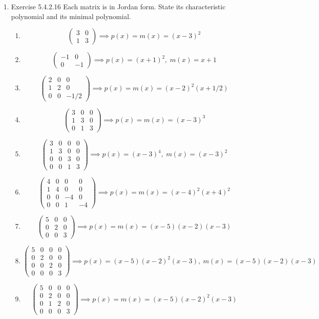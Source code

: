 \documentclass[a4paper]{article}
\begin{document}
\begin{enumerate}
\item{Exercise 5.4.2.16} Each matrix is in Jordan form. State its characteristic polynomial and its minimal polynomial.

\begin{enumerate}
	\item
	$$
	\begin{pmatrix}
	3 & 0 \\ 1 & 3
	\end{pmatrix}
	\implies p(x) = m(x) = (x-3)^2
	$$
	\item
	$$
	\begin{pmatrix}
	-1 & 0 \\ 0 & -1
	\end{pmatrix}
	\implies p(x) = (x+1)^2, \; m(x) = x+1
	$$
	\item
	$$
	\begin{pmatrix}
	2 & 0 & 0 \\ 1 & 2 & 0 \\ 0 & 0 & -1/2
	\end{pmatrix}
	\implies p(x) = m(x) = (x-2)^2(x+1/2)
	$$
	\item
	$$
	\begin{pmatrix}
	3 & 0 & 0 \\ 1 & 3 & 0 \\ 0 & 1 & 3
	\end{pmatrix}
	\implies p(x) = m(x) = (x-3)^3
	$$
	\item
	$$
	\begin{pmatrix}
	3&0&0&0 \\ 1&3&0&0 \\ 0&0&3&0 \\ 0&0&1&3
	\end{pmatrix}
	\implies p(x) = (x-3)^4, \; m(x) = (x-3)^2
	$$
	\item
	$$
	\begin{pmatrix}
	4&0&0&0 \\ 1&4&0&0 \\ 0&0&-4&0 \\ 0&0&1&-4
	\end{pmatrix}
	\implies p(x) = m(x) = (x-4)^2(x+4)^2
	$$
	\item
	$$
	\begin{pmatrix}
	5&0&0 \\ 0&2&0 \\ 0&0&3
	\end{pmatrix}
	\implies p(x) = m(x) = (x-5)(x-2)(x-3)
	$$
	\item
	$$
	\begin{pmatrix}
	5&0&0&0 \\ 0&2&0&0 \\ 0&0&2&0 \\ 0&0&0&3
	\end{pmatrix}
	\implies p(x) = (x-5)(x-2)^2(x-3), \; m(x) = (x-5)(x-2)(x-3)
	$$
	\item
	$$
	\begin{pmatrix}
	5&0&0&0 \\ 0&2&0&0 \\ 0&1&2&0 \\ 0&0&0&3
	\end{pmatrix}
	\implies p(x) = m(x) = (x-5)(x-2)^2(x-3)
	$$
\end{enumerate}


\end{enumerate}
\end{document}
